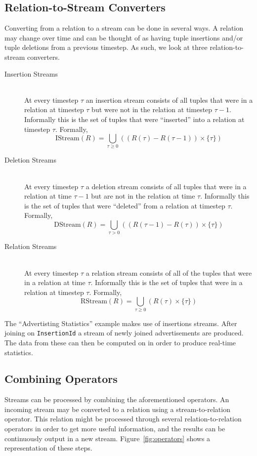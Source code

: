 \documentclass[a4paper, 10pt, conference]{IEEEconf}
\begin{document}
\subsection{Relation-to-Stream Converters}
Converting from a relation to a stream can be done in several ways.  A relation may change over time and can be thought of as having tuple insertions and/or tuple deletions from a previous timestep.  As such, we look at three relation-to-stream converters.  

\begin{description}
    \item[Insertion Streams] \hfill \\
    At every timestep $\tau$ an insertion stream consists of all tuples that were in a relation at timestep $\tau$ but were not in the relation at timestep $\tau - 1$.  Informally this is the set of tuples that were ``inserted'' into a relation at timestep $\tau$. Formally,
    $$\text{IStream}(R) = \bigcup_{\tau \geq 0} ((R(\tau) - R(\tau - 1)) \times \{\tau\})$$

    \item[Deletion Streams] \hfill \\
    At every timestep $\tau$ a deletion stream consists of all tuples that were in a relation at time $\tau - 1$ but are not in the relation at time $\tau$. Informally this is the set of tuples that were ``deleted'' from a relation at timestep $\tau$. Formally, 
    $$\text{DStream}(R) = \bigcup_{\tau > 0} ((R(\tau - 1) - R(\tau)) \times \{\tau\})$$

    \item[Relation Streams] \hfill \\
    At every timestep $\tau$ a relation stream consists of all of the tuples that were in a relation at time $\tau$.  Informally this is the set of tuples that were in a relation at timestep $\tau$. Formally, 
    $$\text{RStream}(R) = \bigcup_{\tau \geq 0} (R(\tau) \times \{\tau\})$$

\end{description}

The ``Advertisting Statistics'' example makes use of insertions streams.  After joining on \texttt{InsertionId} a stream of newly joined advertisements are produced.  The data from these can then be computed on in order to produce real-time statistics.

\subsection{Combining Operators}
Streams can be processed by combining the aforementioned operators.  An incoming stream may be converted to a relation using a stream-to-relation operator.  This relation might be processed through several relation-to-relation operators in order to get more useful information, and the results can be continuously output in a new stream.  Figure~\ref{fig:operators} shows a representation of these steps.
\end{document}
